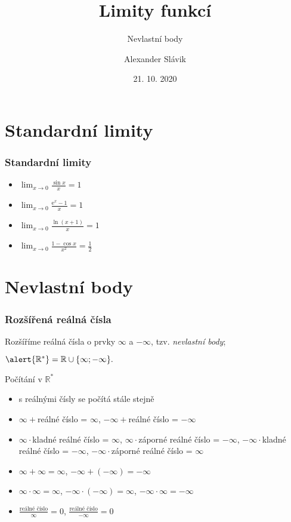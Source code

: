 \documentclass[handout]%
{beamer}
\title{Limity funkcí}
\author{Alexander Slávik} %
\subtitle{Nevlastní body}
\institute{Gymnázium Voděradská}
\date{21. 10. 2020}
\newcommand{\R}{\mathbb R}
\begin{document}
%


\section{Standardní limity}

\begin{frame}
	\frametitle{Standardní limity}
	
	\begin{itemize}
		\parskip\medskipamount
		\item $\displaystyle\lim_{x \to 0} \frac{\sin x}{x} = 1$
		\item $\displaystyle\lim_{x \to 0} \frac{\mathrm{e}^x - 1}{x} = 1$
		\item $\displaystyle\lim_{x \to 0} \frac{\operatorname{ln}(x+1)}{x} = 1$
		\item $\displaystyle\lim_{x \to 0} \frac{1 - \cos x}{x^2} = \frac12$
	\end{itemize}
\end{frame}



\section{Nevlastní body}

\begin{frame}
	\frametitle{Rozšířená reálná čísla}\let\pause\relax
	Rozšíříme reálná čísla o prvky $\infty$ a $-\infty$, tzv. \emph{nevlastní body};\pause
	\begin{center}\LARGE
	$\alert{\R^*} = \R \cup\{\infty; -\infty\}.$
	\end{center}
	\pause
	\begin{block}{Počítání v $\R^*$}\pause
	\begin{itemize}
		\item s  reálnými čísly se počítá stále stejně\pause
		\item $\infty + {}$reálné číslo = \pause $\infty$, \pause $-\infty + {}$reálné číslo = \pause $-\infty$\pause
		\item $\infty \cdot {}$kladné reálné číslo = $\infty$, \pause $\infty \cdot {}$záporné reálné číslo = $-\infty$, \pause
			$-\infty \cdot {}$kladné reálné číslo = $-\infty$, $-\infty \cdot {}$záporné reálné číslo = $\infty$\pause
		\item $\infty + \infty = \infty$, $-\infty + (-\infty) = -\infty$\pause
		\item $\infty \cdot \infty = \infty$, $-\infty \cdot (-\infty) = \infty$, $-\infty \cdot \infty = -\infty$\pause
		\item $\frac{\text{reálné číslo}}{\infty} = 0$, $\frac{\text{reálné číslo}}{-\infty} = 0$
	\end{itemize}
	\end{block}
\end{frame}
\end{document}
